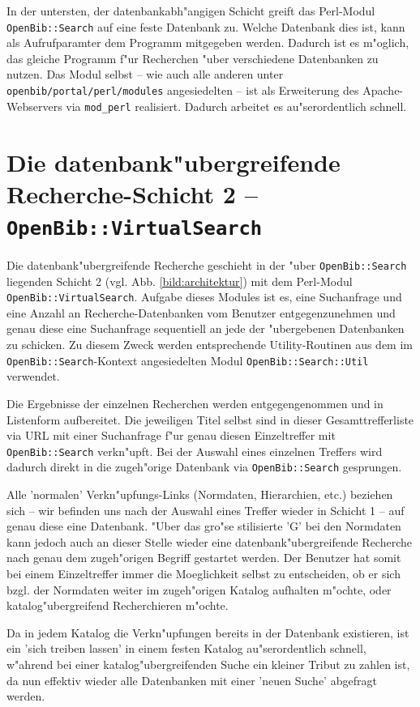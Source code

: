 \documentclass[11pt, twoside, a4paper, BCOR8mm, DIV12, bibtotoc,idxtotoc]{scrbook}
\begin{document}
In der untersten, der datenbankabh"angigen Schicht greift das
Perl-Modul \texttt{OpenBib::Search} auf eine feste Datenbank zu.
Welche Datenbank dies ist, kann als Aufrufparamter dem Programm
mitgegeben werden. Dadurch ist es m"oglich, das gleiche Programm f"ur
Recherchen "uber ver\-schie\-de\-ne Daten\-banken zu nutzen. Das Modul
selbst -- wie auch alle anderen unter
\texttt{openbib/portal/perl/modules} angesiedelten -- ist als
Erweiterung des Apache-Webservers via \texttt{mod\_perl} realisiert.
Dadurch arbeitet es au"ser\-ordentlich schnell.


\section{Die datenbank"ubergreifende Recherche-Schicht 2 -- \texttt{OpenBib::VirtualSearch}}

Die datenbank"ubergreifende Recherche geschieht in der "uber
\texttt{OpenBib::Search} liegenden Schicht 2 (vgl. Abb.
\ref{bild:architektur}) mit dem Perl-Modul
\texttt{OpenBib::VirtualSearch}. Aufgabe dieses Modules ist es, eine
Suchanfrage und eine Anzahl an Recherche-Datenbanken vom Benutzer
entgegen\-zuneh\-men und genau diese eine Suchanfrage sequentiell an
jede der "ubergebenen Datenbanken zu schicken. Zu diesem Zweck werden
entsprechende Utility-Routinen aus dem im
\texttt{OpenBib::Search}-Kontext angesiedelten Modul
\texttt{OpenBib::Search::Util} verwendet.

Die Ergebnisse der einzelnen Recherchen werden entgegengenommen und in
Listenform auf\-be\-rei\-tet. Die jeweiligen Titel selbst sind in dieser
Gesamttrefferliste via URL mit einer Suchanfrage f"ur genau diesen
Einzeltreffer mit \texttt{OpenBib::Search} verkn"upft. 
Bei der
Auswahl eines einzelnen Treffers wird dadurch direkt in die
zugeh"orige Datenbank via \texttt{OpenBib::Search} gesprungen. 

Alle 'normalen' Verkn"upfungs-Links (Normdaten, Hierarchien, etc.)
beziehen sich -- wir befinden uns nach der Auswahl eines Treffer wieder in
Schicht 1 -- auf genau diese eine Datenbank. "Uber das gro"se
stilisierte 'G' bei den Normdaten kann jedoch auch an dieser Stelle
wieder eine datenbank"ubergreifende Recherche nach genau dem
zugeh"origen Begriff gestartet werden. Der Benutzer hat somit bei
einem Einzeltreffer immer die Moeglichkeit selbst zu entscheiden, ob
er sich bzgl. der Normdaten weiter im zugeh"origen Katalog aufhalten
m"ochte, oder katalog"ubergreifend Recherchieren m"ochte.

Da in jedem Katalog die Verkn"upfungen bereits in der Datenbank
existieren, ist ein 'sich treiben lassen' in einem festen Katalog
au"ser\-ordentlich schnell, w"ahrend bei einer katalog"ubergreifenden
Suche ein kleiner Tribut zu zahlen ist, da nun effektiv wieder alle
Datenbanken mit einer 'neuen Suche' abgefragt werden.
\end{document}
